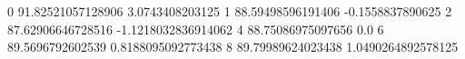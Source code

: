 0 91.82521057128906 3.0743408203125
1 88.59498596191406 -0.1558837890625
2 87.62906646728516 -1.1218032836914062
4 88.75086975097656 0.0
6 89.5696792602539 0.8188095092773438
8 89.79989624023438 1.0490264892578125
